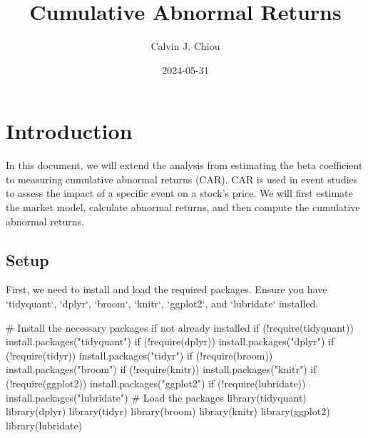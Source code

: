 \documentclass[
]{scrartcl}
\title{Cumulative Abnormal Returns}
\author{Calvin J. Chiou}
\date{2024-05-31}
\newenvironment{Shaded}{\begin{snugshade}}{\end{snugshade}}
\newcommand{\CommentTok}[1]{\textcolor[rgb]{0.37,0.37,0.37}{#1}}
\newcommand{\ControlFlowTok}[1]{\textcolor[rgb]{0.00,0.23,0.31}{#1}}
\newcommand{\FunctionTok}[1]{\textcolor[rgb]{0.28,0.35,0.67}{#1}}
\newcommand{\NormalTok}[1]{\textcolor[rgb]{0.00,0.23,0.31}{#1}}
\newcommand{\SpecialCharTok}[1]{\textcolor[rgb]{0.37,0.37,0.37}{#1}}
\newcommand{\StringTok}[1]{\textcolor[rgb]{0.13,0.47,0.30}{#1}}
\renewcommand*\contentsname{Table of contents}
\newcommand\contentsname{Table of contents}
\begin{document}
\maketitle

\renewcommand*\contentsname{Table of contents}
{
\hypersetup{linkcolor=}
\setcounter{tocdepth}{1}
\tableofcontents
}
\section{Introduction}\label{introduction}

In this document, we will extend the analysis from estimating the beta
coefficient to measuring cumulative abnormal returns (CAR). CAR is used
in event studies to assess the impact of a specific event on a stock's
price. We will first estimate the market model, calculate abnormal
returns, and then compute the cumulative abnormal returns.

\subsection{Setup}\label{setup}

First, we need to install and load the required packages. Ensure you
have `tidyquant`, `dplyr`, `broom`, `knitr`, `ggplot2`, and `lubridate`
installed.

\begin{Shaded}
\begin{Highlighting}[]
\CommentTok{\# Install the necessary packages if not already installed}
\ControlFlowTok{if}\NormalTok{ (}\SpecialCharTok{!}\FunctionTok{require}\NormalTok{(tidyquant)) }\FunctionTok{install.packages}\NormalTok{(}\StringTok{"tidyquant"}\NormalTok{)}
\ControlFlowTok{if}\NormalTok{ (}\SpecialCharTok{!}\FunctionTok{require}\NormalTok{(dplyr)) }\FunctionTok{install.packages}\NormalTok{(}\StringTok{"dplyr"}\NormalTok{)}
\ControlFlowTok{if}\NormalTok{ (}\SpecialCharTok{!}\FunctionTok{require}\NormalTok{(tidyr)) }\FunctionTok{install.packages}\NormalTok{(}\StringTok{"tidyr"}\NormalTok{)}
\ControlFlowTok{if}\NormalTok{ (}\SpecialCharTok{!}\FunctionTok{require}\NormalTok{(broom)) }\FunctionTok{install.packages}\NormalTok{(}\StringTok{"broom"}\NormalTok{)}
\ControlFlowTok{if}\NormalTok{ (}\SpecialCharTok{!}\FunctionTok{require}\NormalTok{(knitr)) }\FunctionTok{install.packages}\NormalTok{(}\StringTok{"knitr"}\NormalTok{)}
\ControlFlowTok{if}\NormalTok{ (}\SpecialCharTok{!}\FunctionTok{require}\NormalTok{(ggplot2)) }\FunctionTok{install.packages}\NormalTok{(}\StringTok{"ggplot2"}\NormalTok{)}
\ControlFlowTok{if}\NormalTok{ (}\SpecialCharTok{!}\FunctionTok{require}\NormalTok{(lubridate)) }\FunctionTok{install.packages}\NormalTok{(}\StringTok{"lubridate"}\NormalTok{)}
\CommentTok{\# Load the packages}
\FunctionTok{library}\NormalTok{(tidyquant)}
\FunctionTok{library}\NormalTok{(dplyr)}
\FunctionTok{library}\NormalTok{(tidyr)}
\FunctionTok{library}\NormalTok{(broom)}
\FunctionTok{library}\NormalTok{(knitr)}
\FunctionTok{library}\NormalTok{(ggplot2)}
\FunctionTok{library}\NormalTok{(lubridate)}
\end{Highlighting}
\end{Shaded}
\end{document}
